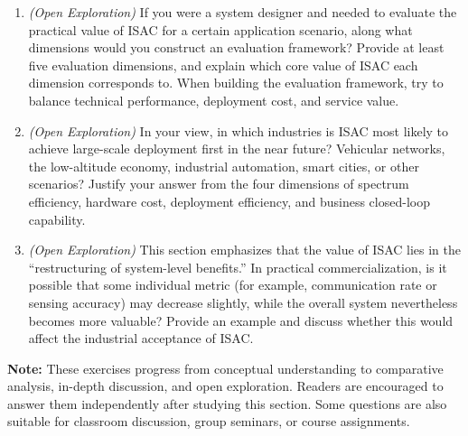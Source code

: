 \begin{enumerate}[label=\textbf{\arabic*.}, leftmargin=*]
    \item \textit{(Open Exploration)} If you were a system designer and needed to evaluate the practical value of ISAC for a certain application scenario, along what dimensions would you construct an evaluation framework? Provide at least five evaluation dimensions, and explain which core value of ISAC each dimension corresponds to. When building the evaluation framework, try to balance technical performance, deployment cost, and service value.

    \item \textit{(Open Exploration)} In your view, in which industries is ISAC most likely to achieve large-scale deployment first in the near future? Vehicular networks, the low-altitude economy, industrial automation, smart cities, or other scenarios? Justify your answer from the four dimensions of spectrum efficiency, hardware cost, deployment efficiency, and business closed-loop capability.

    \item \textit{(Open Exploration)} This section emphasizes that the value of ISAC lies in the ``restructuring of system-level benefits.'' In practical commercialization, is it possible that some individual metric (for example, communication rate or sensing accuracy) may decrease slightly, while the overall system nevertheless becomes more valuable? Provide an example and discuss whether this would affect the industrial acceptance of ISAC.

\end{enumerate}

\noindent\textbf{Note:}
These exercises progress from conceptual understanding to comparative analysis,
in-depth discussion, and open exploration. Readers are encouraged to answer them
independently after studying this section. Some questions are also suitable for
classroom discussion, group seminars, or course assignments.